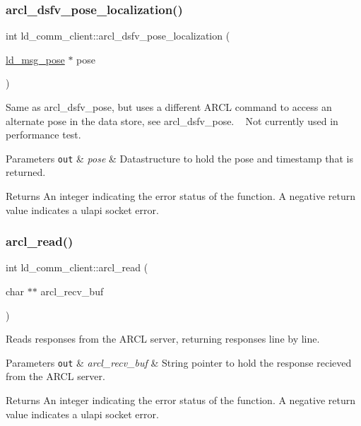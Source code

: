 \subsubsection{\texorpdfstring{arcl\+\_\+dsfv\+\_\+pose\+\_\+localization()}{arcl\_dsfv\_pose\_localization()}}
{\footnotesize\ttfamily int ld\+\_\+comm\+\_\+client\+::arcl\+\_\+dsfv\+\_\+pose\+\_\+localization (\begin{DoxyParamCaption}\item[{\hyperlink{structld__msg__pose}{ld\+\_\+msg\+\_\+pose} $\ast$}]{pose }\end{DoxyParamCaption})}

Same as arcl\+\_\+dsfv\+\_\+pose, but uses a different A\+R\+CL command to access an alternate pose in the data store, see arcl\+\_\+dsfv\+\_\+pose. ~\newline
Not currently used in performance test. 
\begin{DoxyParams}[1]{Parameters}
\mbox{\tt out}  & {\em pose} & Datastructure to hold the pose and timestamp that is returned. \\
\hline
\end{DoxyParams}
\begin{DoxyReturn}{Returns}
An integer indicating the error status of the function. A negative return value indicates a ulapi socket error. 
\end{DoxyReturn}
\mbox{\label{classld__comm__client_ad43c866e91c88f9dfd7e50fdec941607}} 
\subsubsection{\texorpdfstring{arcl\+\_\+read()}{arcl\_read()}}
{\footnotesize\ttfamily int ld\+\_\+comm\+\_\+client\+::arcl\+\_\+read (\begin{DoxyParamCaption}\item[{char $\ast$$\ast$}]{arcl\+\_\+recv\+\_\+buf }\end{DoxyParamCaption})}

Reads responses from the A\+R\+CL server, returning responses line by line. 
\begin{DoxyParams}[1]{Parameters}
\mbox{\tt out}  & {\em arcl\+\_\+recv\+\_\+buf} & String pointer to hold the response recieved from the A\+R\+CL server. \\
\hline
\end{DoxyParams}
\begin{DoxyReturn}{Returns}
An integer indicating the error status of the function. A negative return value indicates a ulapi socket error. 
\end{DoxyReturn}
\mbox{\label{classld__comm__client_aa6ff20939ad36ccbe390d1c3d9b1b242}} 
